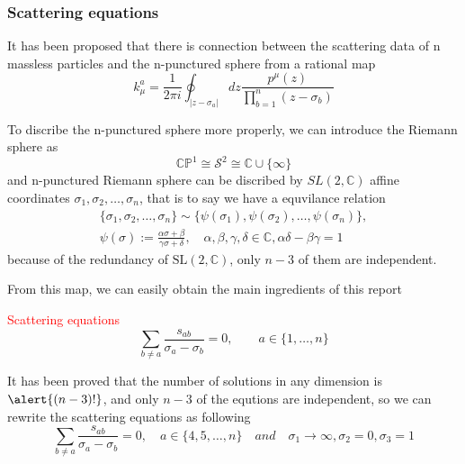\documentclass{beamer}
\begin{document}
\begin{frame}
    \frametitle{Scattering equations}
    It has been proposed that there is connection between the scattering data of n massless particles and the n-punctured sphere from a rational map
    \begin{equation*}
        k_\mu^a=\frac{1}{2\pi i}\oint_{|z-\sigma_a|}dz\frac{p^\mu(z)}{\prod ^n_{b=1}(z-\sigma_b)}
    \end{equation*}
 
    To discribe the n-punctured sphere more properly, we can introduce the Riemann sphere as
    \begin{equation*}
        \mathbb{CP}^1\cong \mathcal{S}^2\cong \mathbb{C}\cup\{\infty\}
    \end{equation*}
    and n-punctured Riemann sphere can be discribed by $SL(2,\mathbb{C})$ affine coordinates ${\sigma_1,\sigma_2,\ldots,\sigma_n}$, that is to say we have a equvilance relation
    \begin{align*}
        \{\sigma_1,\sigma_2,\ldots,\sigma_n\}\sim\{\psi(\sigma_1),\psi(\sigma_2),\ldots,\psi(\sigma_n)\},\\\psi(\sigma):=\frac{\alpha\sigma+\beta}{\gamma\sigma+\delta},\quad\alpha,\beta,\gamma,\delta\in\mathbb{C},\alpha\delta-\beta\gamma=1
    \end{align*}
    because of the redundancy of $\mathrm{SL}(2,\mathbb{C})$, only $n-3$ of them are independent.
\end{frame}
\begin{frame}
    From this map, we can easily obtain the main ingredients of this report \\
    

    \begin{block}{\textcolor{red}{Scattering equations}}
        \begin{equation*}
            \sum_{b\neq a } \frac{s_{ab}}{\sigma_a-\sigma_{b}}=0,\qquad a\in \{1,\dots,n\}
        \end{equation*}
    \end{block}
    It has been proved that the number of solutions in any dimension is $\alert{(n-3)!}$, and only \alert{$n-3$} of the equtions are independent, so we can rewrite the scattering equations as following 
    \begin{equation*}
        \sum_{b\neq a } \frac{s_{ab}}{\sigma_a-\sigma_{b}}=0,\quad a\in \{4,5,\dots,n\}\quad and\quad  \sigma_1\rightarrow\infty,\sigma_2=0,\sigma_3=1
    \end{equation*}
\end{frame}
\iffalse
\end{document}
